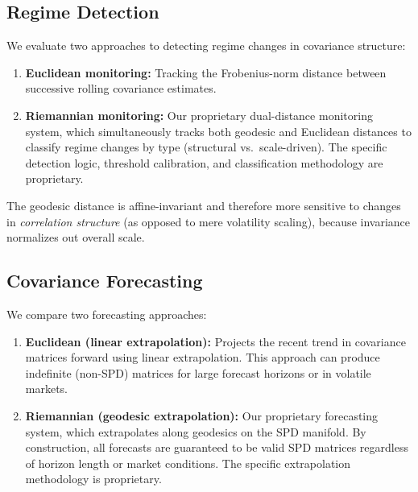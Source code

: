 \documentclass[12pt,a4paper]{article}
\begin{document}
\subsection{Regime Detection}

We evaluate two approaches to detecting regime changes in covariance structure:

\begin{enumerate}[label=(\roman*)]
    \item \textbf{Euclidean monitoring:} Tracking the Frobenius-norm distance
    between successive rolling covariance estimates.

    \item \textbf{Riemannian monitoring:} Our proprietary dual-distance
    monitoring system, which simultaneously tracks both geodesic and
    Euclidean distances to classify regime changes by type (structural
    vs.\ scale-driven). The specific detection logic, threshold calibration,
    and classification methodology are proprietary.
\end{enumerate}

The geodesic distance is affine-invariant and therefore more sensitive to
changes in \emph{correlation structure} (as opposed to mere volatility
scaling), because invariance normalizes out overall scale.

\subsection{Covariance Forecasting}

We compare two forecasting approaches:

\begin{enumerate}[label=(\roman*)]
    \item \textbf{Euclidean (linear extrapolation):} Projects the recent
    trend in covariance matrices forward using linear extrapolation.
    This approach can produce indefinite (non-SPD) matrices for large
    forecast horizons or in volatile markets.

    \item \textbf{Riemannian (geodesic extrapolation):} Our proprietary
    forecasting system, which extrapolates along geodesics on the SPD
    manifold. By construction, all forecasts are guaranteed to be valid
    SPD matrices regardless of horizon length or market conditions.
    The specific extrapolation methodology is proprietary.
\end{enumerate}


\end{document}
